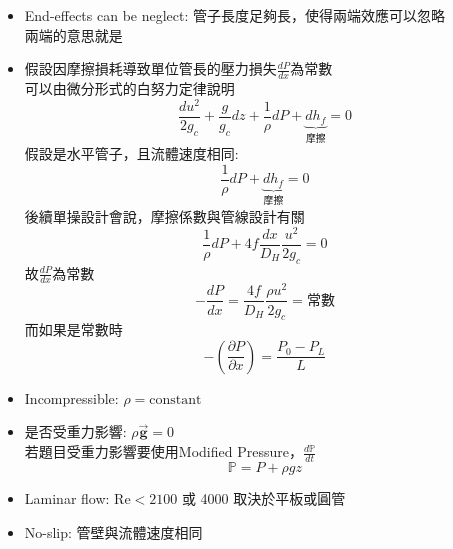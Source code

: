 \documentclass[../main.tex]{subfiles}
\begin{document}
\begin{itemize}
\begin{enumerate}
\begin{itemize}
        速度分布曲線不再隨流動方向的深度而改變(假設流向$x$)
        \begin{equation}
          \boxed{u_x \neq f(x)} \implies u_x = f(t,y,z) \implies \frac{\partial u_x}{\partial x} = 0
        \end{equation}
        以管子來說，會是之後的流動狀態
      \item End-effects can be neglect: 管子長度足夠長，使得兩端效應可以忽略\\
        兩端的意思就是
      \item 假設因摩擦損耗導致單位管長的壓力損失$\frac{dP}{dx}$為常數\\
        可以由微分形式的白努力定律說明
        \begin{equation}
          \frac{d u^2}{2g_c} +\frac{g}{g_c}dz + \frac{1}{\rho}dP + \underbrace{dh_f}_{\text{摩擦}} = 0 \label{eq:diff_bernoulli}
        \end{equation}
        假設是水平管子，且流體速度相同:
        \begin{equation}
          \frac{1}{\rho}dP + \underbrace{dh_f}_{\text{摩擦}} = 0
        \end{equation}
        後續單操設計會說，摩擦係數與管線設計有關
        \begin{equation}
          \frac{1}{\rho} dP + 4f \frac{dx}{D_H}\frac{u^2}{2g_c} = 0 
        \end{equation}
        故$\frac{dP}{dx}$為常數
        \begin{equation}
          -\frac{dP}{dx} = \frac{4f}{D_H}\frac{\rho u^2}{2g_c} = \text{常數}
        \end{equation}
        而如果是常數時
        \begin{equation}
          -\left(\frac{\partial P}{\partial x}\right) = \frac{P_0-P_L}{L}
        \end{equation}
      \item Incompressible: $\rho = \text{constant}$
      \item 是否受重力影響: $\rho \vec {\bm g} = 0$\\
        若題目受重力影響要使用Modified Pressure，$\frac{d\mathbb{P}}{dt}$
        \begin{equation}
          \boxed{\mathbb{P} = P + \rho g z}
        \end{equation}
      \item Laminar flow: $\text{Re} < 2100$ 或 4000 取決於平板或圓管
      \item No-slip: 管壁與流體速度相同

\end{itemize}
\end{enumerate}
\end{itemize}
\end{document}
